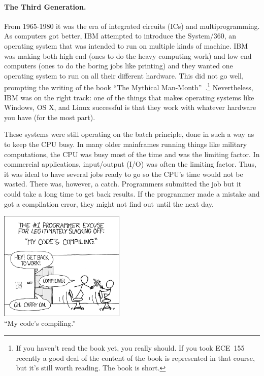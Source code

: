 \paragraph{The Third Generation.} From 1965-1980 it was the era of integrated circuits (ICs) and multiprogramming. As computers got better, IBM attempted to introduce the System/360, an operating system that was intended to run on multiple kinds of machine. IBM was making both high end (ones to do the heavy computing work) and low end computers (ones to do the boring jobs like printing) and they wanted one operating system to run on all their different hardware. This did not go well, prompting the writing of the book ``The Mythical Man-Month''~\cite{mmm}.\footnote{If you haven't read the book yet, you really should. If you took ECE~155 recently a good deal of the content of the book is represented in that course, but it's still worth reading. The book is short.} Nevertheless, IBM was on the right track: one of the things that makes operating systems like Windows, OS X, and Linux successful is that they work with whatever hardware you have (for the most part). 

These systems were still operating on the batch principle, done in such a way as to keep the CPU busy. In many older mainframes running things like military computations, the CPU was busy most of the time and was the limiting factor. In commercial applications, input/output (I/O) was often the limiting factor. Thus, it was ideal to have several jobs ready to go so the CPU's time would not be wasted. There was, however, a catch. Programmers submitted the job but it could take a long time to get back results. If the programmer made a mistake and got a compilation error, they might not find out until the next day. 

\begin{center}
\includegraphics[width=0.45\textwidth]{images/compiling.png}\\
``My code's compiling.'' ~\cite{xkcd:compiling}
\end{center}

